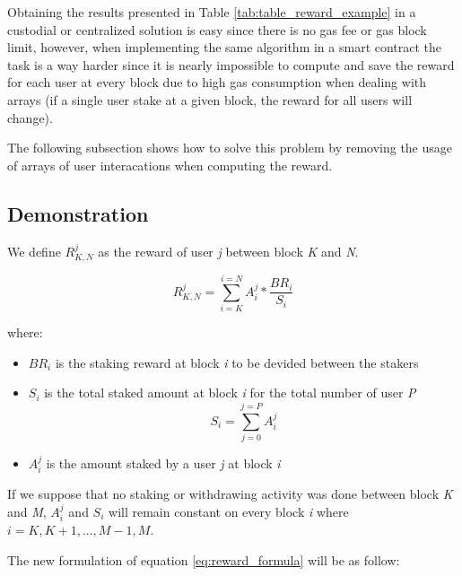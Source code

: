\documentclass[a4paper]{article}
\begin{document}
\noindent
Obtaining the results presented in Table \ref{tab:table_reward_example} in a custodial or centralized solution is easy since there is no gas fee or gas block limit, however, when implementing the same algorithm in a smart contract the task is a way harder since it is nearly impossible to compute and save the reward for each user at every block due to high gas consumption when dealing with arrays (if a single user stake at a given block, the reward for all users will change).\par
\noindent
The following subsection shows how to solve this problem by removing the usage of arrays of user interacations when computing the reward.\par
\subsection{Demonstration}
\begin{flushleft}
We define $R_{K,N}^{j}$ as the reward of user \textit{j} between block \textit{K} and \textit{N}.
\end{flushleft}
\begin{equation} \label{eq:reward_formula}
R_{K,N}^{j}= \sum_{i=K}^{i=N} A_i^j * \frac{\mathit{BR}_i}{S_i} 
\end{equation}
\begin{flushleft}
where:\
\end{flushleft}
\begin{itemize}
  \item $ \mathit{BR}_i $ is the staking reward at block \textit{i} to be devided between the stakers
  \item $ S_i$ is the total staked amount at block \textit{i} for the total number of user \textit{P} 
  	\begin{equation} \label{eq:total_stake}
	    S_i= \sum_{j=0}^{j=P}A_i^j
	  \end{equation}
  \item $A_i^j$ is the amount staked by a user \textit{j} at block \textit{i}
\end{itemize}
\begin{flushleft}
If we suppose that no staking or withdrawing activity was done between block \textit{K} and \textit{M}, $A_i^j$ and $S_i$ will remain constant on every block \textit{i} where $i=K,K+1,...,M-1,M$.
\end{flushleft}
\begin{flushleft}
The new formulation of equation \ref{eq:reward_formula} will be as follow:
\end{flushleft}
\end{document}
